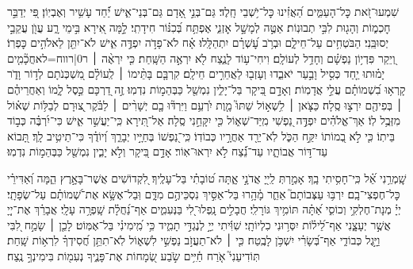 \documentclass[twoside, openany, parskip=half, 11pt]{book}
\begin{document}
\begin{sometimes}

שִׁמְעוּ־זֹ֭את כׇּל־הָעַמִּ֑ים הַ֝אֲזִ֗ינוּ כׇּל־יֹ֥שְׁבֵי חָֽלֶד׃
גַּם־בְּנֵ֣י אָ֭דָם גַּם־בְּנֵי־אִ֑ישׁ יַ֗֝חַד עָשִׁ֥יר וְאֶבְיֽוֹן׃
פִּ֭י יְדַבֵּ֣ר חׇכְמ֑וֹת וְהָג֖וּת לִבִּ֣י תְבוּנֽוֹת׃
אַטֶּ֣ה לְמָשָׁ֣ל אׇזְנִ֑י אֶפְתַּ֥ח בְּ֝כִנּ֗וֹר חִידָתִֽי׃
לָ֣מָּה אִ֭ירָא בִּ֣ימֵי רָ֑ע עֲוֺ֖ן עֲקֵבַ֣י יְסוּבֵּֽנִי׃
הַבֹּטְחִ֥ים עַל־חֵילָ֑ם וּבְרֹ֥ב עׇ֝שְׁרָ֗ם יִתְהַלָּֽלוּ׃
אָ֗ח לֹא־פָדֹ֣ה יִפְדֶּ֣ה אִ֑ישׁ לֹא־יִתֵּ֖ן לֵאלֹהִ֣ים כׇּפְרֽוֹ׃
וְ֭יֵקַר פִּדְי֥וֹן נַפְשָׁ֗ם וְחָדַ֥ל לְעוֹלָֽם׃
וִיחִי־ע֥וֹד לָנֶ֑צַח לֹ֖א יִרְאֶ֣ה הַשָּֽׁחַת׃
כִּ֤י יִרְאֶ֨ה ׀ {{ר0|רווח=לא}}חֲכָ֘מִ֤ים יָמ֗וּתוּ יַ֤חַד כְּסִ֣יל וָבַ֣עַר יֹאבֵ֑דוּ וְעָזְב֖וּ לַאֲחֵרִ֣ים חֵילָֽם׃
קִרְבָּ֤ם בָּתֵּ֨ימוֹ ׀ לְֽעוֹלָ֗ם מִ֭שְׁכְּנֹתָם לְד֣וֹר וָדֹ֑ר קָרְא֥וּ בִ֝שְׁמוֹתָ֗ם עֲלֵ֣י אֲדָמֽוֹת׃
וְאָדָ֣ם בִּ֭יקָר בַּל־יָלִ֑ין נִמְשַׁ֖ל כַּבְּהֵמ֣וֹת נִדְמֽוּ׃
זֶ֣ה דַ֭רְכָּם כֵּ֣סֶל לָ֑מוֹ וְאַחֲרֵיהֶ֓ם ׀ בְּפִיהֶ֖ם יִרְצ֣וּ סֶֽלָה׃
כַּצֹּ֤אן ׀ לִ֥שְׁא֣וֹל שַׁתּוּ֮ מָ֤וֶת יִ֫רְעֵ֥ם וַיִּרְדּ֘וּ בָ֤ם יְשָׁרִ֨ים ׀ לַבֹּ֗קֶר ְ֭צוּרָם לְבַלּ֥וֹת שְׁא֗וֹל מִזְּבֻ֥ל לֽוֹ׃
אַךְ־אֱלֹהִ֗ים יִפְדֶּ֣ה נַ֭פְשִׁי מִֽיַּד־שְׁא֑וֹל כִּ֖י יִקָּחֵ֣נִי סֶֽלָה׃
אַל־תִּ֭ירָא כִּֽי־יַעֲשִׁ֣ר אִ֑ישׁ כִּי־יִ֝רְבֶּ֗ה כְּב֣וֹד בֵּיתֽוֹ׃
כִּ֤י לֹ֣א בְ֭מוֹתוֹ יִקַּ֣ח הַכֹּ֑ל לֹֽא־יֵרֵ֖ד אַחֲרָ֣יו כְּבוֹדֽוֹ׃
כִּֽי־נַ֭פְשׁוֹ בְּחַיָּ֣יו יְבָרֵ֑ךְ וְ֝יוֹדֻ֗ךָ כִּי־תֵיטִ֥יב לָֽךְ׃
תָּ֭בוֹא עַד־דּ֣וֹר אֲבוֹתָ֑יו עַד־נֵ֗֝צַח לֹ֣א יִרְאוּ־אֽוֹר׃
אָדָ֣ם בִּ֭יקָר וְלֹ֣א יָבִ֑ין נִמְשַׁ֖ל כַּבְּהֵמ֣וֹת נִדְמֽוּ׃


\sepline

שׇֽׁמְרֵ֥נִי אֵ֝֗ל כִּֽי־חָסִ֥יתִי בָֽךְ׃
אָמַ֣רְתְּ לַֽייָ֭ אֲדֹנָ֣י אָ֑תָּה ט֝וֹבָתִ֗י בַּל־עָלֶֽיךָ׃
לִ֭קְדוֹשִׁים אֲשֶׁר־בָּאָ֣רֶץ הֵ֑מָּה וְ֝אַדִּירֵ֗י כׇּל־חֶפְצִי־בָֽם׃
יִרְבּ֥וּ עַצְּבוֹתָם֮ אַחֵ֢ר מָ֫הָ֥רוּ בַּל־אַסִּ֣יךְ נִסְכֵּיהֶ֣ם מִדָּ֑ם וּֽבַל־אֶשָּׂ֥א אֶת־שְׁ֝מוֹתָ֗ם עַל־שְׂפָתָֽי׃
יְיָ֗ מְנָת־חֶלְקִ֥י וְכוֹסִ֑י אַ֝תָּ֗ה תּוֹמִ֥יךְ גּוֹרָלִֽי׃
חֲבָלִ֣ים נָֽפְלוּ־לִ֭י בַּנְּעִמִ֑ים אַף־נַ֝חֲלָ֗ת שָֽׁפְרָ֥ה עָלָֽי׃
אֲבָרֵ֗ךְ אֶת־יְיָ֭ אֲשֶׁ֣ר יְעָצָ֑נִי אַף־לֵ֝יל֗וֹת יִסְּר֥וּנִי כִלְיוֹתָֽי׃
שִׁוִּ֬יתִי יְיָ֣ לְנֶגְדִּ֣י תָמִ֑יד כִּ֥י מִֽ֝ימִינִ֗י בַּל־אֶמּֽוֹט׃
לָכֵ֤ן ׀ שָׂמַ֣ח לִ֭בִּי וַיָּ֣גֶל כְּבוֹדִ֑י אַף־בְּ֝שָׂרִ֗י יִשְׁכֹּ֥ן לָבֶֽטַח׃
כִּ֤י ׀ לֹא־תַעֲזֹ֣ב נַפְשִׁ֣י לִשְׁא֑וֹל לֹֽא־תִתֵּ֥ן חֲ֝סִידְךָ֗ לִרְא֥וֹת שָֽׁחַת׃
תּֽוֹדִיעֵנִי֮ אֹ֤רַח חַ֫יִּ֥ים שֹׂ֣בַע שְׂ֭מָחוֹת אֶת־פָּנֶ֑יךָ נְעִמ֖וֹת בִּימִינְךָ֣ נֶֽצַח׃

\end{sometimes}
\end{document}
